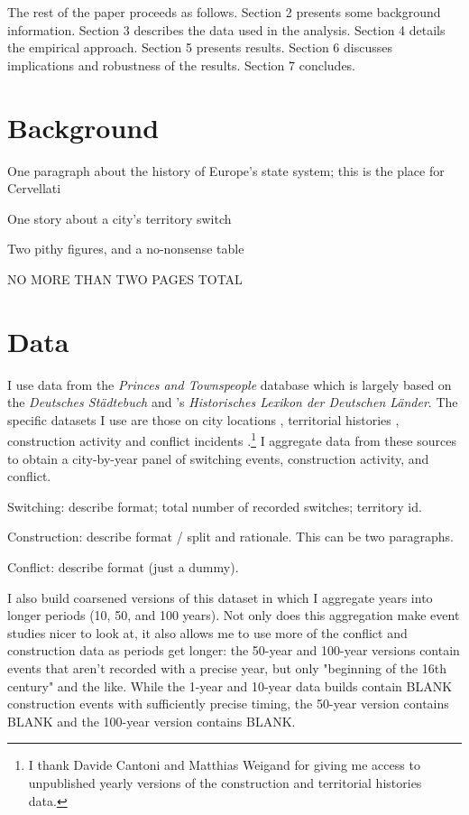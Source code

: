 \documentclass{article}
\begin{document}
The rest of the paper proceeds as follows. Section 2 presents some background information. Section 3 describes the data used in the analysis. Section 4 details the empirical approach. Section 5 presents results. Section 6 discusses implications and robustness of the results. Section 7 concludes.


\section{Background}


One paragraph about the history of Europe's state system; this is the place for Cervellati

One story about a city's territory switch

Two pithy figures, and a no-nonsense table

NO MORE THAN TWO PAGES TOTAL


\section{Data}

I use data from the \textit{Princes and Townspeople} database which is largely based on the \textit{Deutsches Städtebuch} \citep{keyser1939} and \cite{kobler2007}'s \textit{Historisches Lexikon der Deutschen Länder}. The specific datasets I use are those on city locations \citep{pt1}, territorial histories \citep{pt2}, construction activity \citep{pt5} and conflict incidents \citep{pt6}.\footnote{I thank Davide Cantoni and Matthias Weigand for giving me access to unpublished yearly versions of the construction and territorial histories data.} I aggregate data from these sources to obtain a city-by-year panel of switching events, construction activity, and conflict. 

Switching: describe format; total number of recorded switches; territory id.

Construction: describe format / split and rationale. This can be two paragraphs.

Conflict: describe format (just a dummy).


I also build coarsened versions of this dataset in which I aggregate years into longer periods (10, 50, and 100 years). Not only does this aggregation make event studies nicer to look at, it also allows me to use more of the conflict and construction data as periods get longer: the 50-year and 100-year versions contain events that aren't recorded with a precise year, but only "beginning of the 16th century" and the like. While the 1-year and 10-year data builds contain BLANK construction events with sufficiently precise timing, the 50-year version contains BLANK and the 100-year version contains BLANK.
\end{document}
